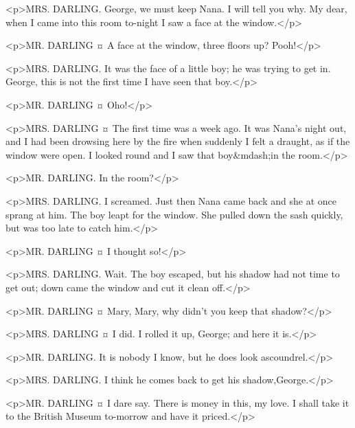 <p>MRS. DARLING. George, we must keep Nana. I will tell you why.
My dear, when I came into this room to-night I saw a face at the window.</p>

<p>MR. DARLING ¤
A face at the window, three floors up? Pooh!</p>

<p>MRS. DARLING. It was the face of a little boy; he was trying to get in. George, this is not the first time I have seen that boy.</p>

<p>MR. DARLING ¤
Oho!</p>

<p>MRS. DARLING ¤
The first time was a week ago. It was Nana's night out, and I had been drowsing here by the fire when suddenly I felt a draught, as if the window were open. I looked round and I saw that boy&mdash;in the room.</p>

<p>MR. DARLING. In the room?</p>

<p>MRS. DARLING. I screamed. Just then Nana came back and she at once sprang at him. The boy leapt for the window. She pulled down the sash quickly, but was too late to catch him.</p>

<p>MR. DARLING ¤
I thought so!</p>

<p>MRS. DARLING. Wait. The boy escaped, but his shadow had not time to get out; down came the window and cut it clean off.</p>

<p>MR. DARLING ¤
Mary, Mary, why didn't you keep that shadow?</p>

<p>MRS. DARLING ¤
I did. I rolled it up, George; and here it is.</p>


<p>MR. DARLING. It is nobody I know, but he does look ascoundrel.</p>

<p>MRS. DARLING. I think he comes back to get his shadow,George.</p>

<p>MR. DARLING ¤
I dare say.
There is money in this, my love. I shall take it to the British Museum to-morrow and have it priced.</p>

